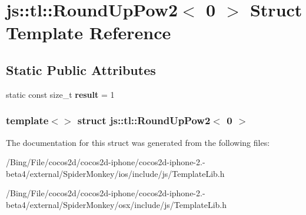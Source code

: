 \hypertarget{structjs_1_1tl_1_1_round_up_pow2_3_010_01_4}{\section{js\-:\-:tl\-:\-:Round\-Up\-Pow2$<$ 0 $>$ Struct Template Reference}
\label{structjs_1_1tl_1_1_round_up_pow2_3_010_01_4}
}
\subsection*{Static Public Attributes}
\begin{DoxyCompactItemize}
\item 
\hypertarget{structjs_1_1tl_1_1_round_up_pow2_3_010_01_4_a264c2442a99e70fc1d85141e023f1bc8}{static const size\-\_\-t {\bfseries result} = 1}\label{structjs_1_1tl_1_1_round_up_pow2_3_010_01_4_a264c2442a99e70fc1d85141e023f1bc8}

\end{DoxyCompactItemize}
\subsubsection*{template$<$$>$ struct js\-::tl\-::\-Round\-Up\-Pow2$<$ 0 $>$}



The documentation for this struct was generated from the following files\-:\begin{DoxyCompactItemize}
\item 
/\-Bing/\-File/cocos2d/cocos2d-\/iphone/cocos2d-\/iphone-\/2.-\/beta4/external/\-Spider\-Monkey/ios/include/js/Template\-Lib.\-h\item 
/\-Bing/\-File/cocos2d/cocos2d-\/iphone/cocos2d-\/iphone-\/2.-\/beta4/external/\-Spider\-Monkey/osx/include/js/Template\-Lib.\-h\end{DoxyCompactItemize}

